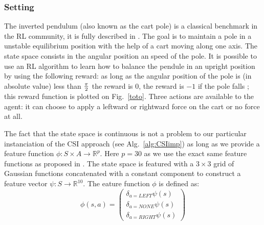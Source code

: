 \documentclass[smallextended]{svjour3}
\begin{document}
\subsubsection{Setting}
The inverted pendulum (also known as the cart pole) is a classical benchmark in the RL community, it is fully described in \cite{lagoudakis2003least}. The goal is to maintain a pole in a unstable equilibrium position with the help of a cart moving along one axis. The state space consists in the angular position an speed of the pole. It is possible to use an RL algorithm to learn how to balance the pendule in an upright position by using the following reward: as long as the angular position of the pole is (in absolute value) less than $\pi \over 2$ the reward is $0$, the reward is $-1$ if the pole falls ; this reward function is plotted on Fig.~\ref{toto}. Three actions are available to the agent: it can choose to apply a leftward or rightward force on the cart or no force at all.

The fact that the state space is continuous is not a problem to our particular instanciation of the CSI approach (see Alg.~\ref{alg:CSIimp}) as long as we provide a feature function $\phi: S\times A \rightarrow \mathbb{R}^p$. Here $p=30$ as we use the exact same feature functions as proposed in \cite{lagoudakis2003least}. The state space is featured with a $3\times 3$ grid of Gaussian functions concatenated with a constant component to construct a feature vector $\psi:S \rightarrow \mathbb{R}^{10}$. The eature function $\phi$ is defined as:
\begin{equation}
  \phi(s,a) = \begin{pmatrix}
     \delta_{a = LEFT}\psi(s)\\
     \delta_{a = NONE}\psi(s)\\
     \delta_{a = RIGHT}\psi(s)
  \end{pmatrix}
\end{equation}
\end{document}
